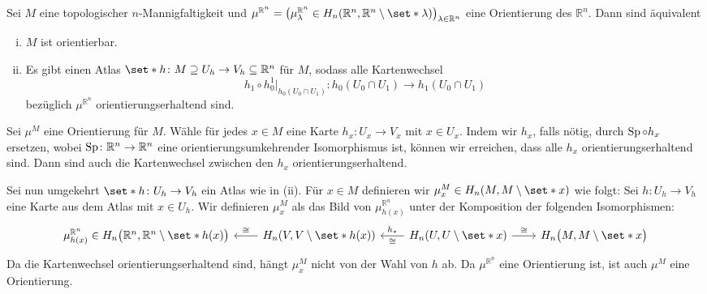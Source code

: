 \begin{satz}
	Sei $M$ eine topologischer $n$-Mannigfaltigkeit und $\mu^{\mathbb{R}^n} = \enbrace*{\mu_\lambda^{\mathbb{R}^n} \in H_n(\mathbb{R}^n, \mathbb{R}^n \setminus \set*{\lambda})}_{\lambda \in \mathbb{R}^n}$ eine Orientierung des $\mathbb{R}^n$.
	Dann sind äquivalent
	\begin{enumerate}[(i)]
		\item $M$ ist orientierbar.
		\item Es gibt einen Atlas $\set*{h \colon M\supseteq U_h \to V_h \subseteq \mathbb{R}^n}$ für $M$, sodass alle Kartenwechsel 
		\[
			h_1 \circ h_0^1 \big|_{h_0(U_0 \cap U_1)} \colon h_0 (U_0 \cap U_1) \longrightarrow h_1(U_0 \cap U_1)
		\]
		bezüglich $\mu^{\mathbb{R}^n}$ orientierungserhaltend sind.
	\end{enumerate}
\end{satz}
\begin{beweis}
	Sei $\mu^M$ eine Orientierung für $M$.
	Wähle für jedes $x \in M$ eine Karte $h_x \colon U_x \to V_x$ mit $x \in U_x$.
	Indem wir $h_x$, falls nötig, durch $\operatorname{Sp} \circ h_x$ ersetzen, wobei $\operatorname{Sp} \colon \mathbb{R}^n \to \mathbb{R}^n$ eine orientierungsumkehrender Isomorphismus ist, können wir erreichen, dass alle $h_x$ orientierungserhaltend sind.
	Dann sind auch die Kartenwechsel zwischen den $h_x$ orientierungserhaltend.
	
	Sei nun umgekehrt $\set*{h \colon U_h \to V_h}$ ein Atlas wie in (ii).
	Für $x \in M$ definieren wir $\mu_x^M \in H_n(M,M \setminus \set*{x})$ wie folgt: 
	Sei $h  \colon U_h \to V_h$ eine Karte aus dem Atlas mit $x \in U_h$.
	Wir definieren $\mu_x^M$ als das Bild von $\mu_{h(x)}^{\mathbb{R}^n}$ unter der Komposition der folgenden Isomorphismen:
	\[
		\begin{tikzcd}[sep=2.1em]
			\mu^{\mathbb{R}^n}_{h(x)} \in H_n \enbrace[\big]{\mathbb{R}^n,\mathbb{R}^n \setminus \set*{h(x)}} & H_n(V,V\setminus \set*{h(x)}) \lar["\cong"'] &
			H_n(U,U \setminus \set*{x}) \lar["\cong","h_*"'] \rar["\cong"] & H_n \enbrace[\big]{M,M \setminus \set*{x}}
		\end{tikzcd}
	\]
	Da die Kartenwechsel orientierungserhaltend sind, hängt $\mu_x^M$ nicht von der Wahl von $h$ ab.
	Da $\mu^{\mathbb{R}^n}$ eine Orientierung ist, ist auch $\mu^M$ eine Orientierung.
\end{beweis}


